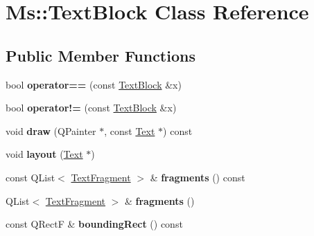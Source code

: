 \hypertarget{class_ms_1_1_text_block}{}\section{Ms\+:\+:Text\+Block Class Reference}
\label{class_ms_1_1_text_block}
\subsection*{Public Member Functions}
\begin{DoxyCompactItemize}
\item 
\mbox{\label{class_ms_1_1_text_block_a792e482fdf503efcc05d595ead80e629}} 
bool {\bfseries operator==} (const \hyperlink{class_ms_1_1_text_block}{Text\+Block} \&x)
\item 
\mbox{\label{class_ms_1_1_text_block_a511e9ebeec24d3b8bf428905e861dce3}} 
bool {\bfseries operator!=} (const \hyperlink{class_ms_1_1_text_block}{Text\+Block} \&x)
\item 
\mbox{\label{class_ms_1_1_text_block_a3822e81e3eb902050f7af7c189ae0f61}} 
void {\bfseries draw} (Q\+Painter $\ast$, const \hyperlink{class_ms_1_1_text}{Text} $\ast$) const
\item 
\mbox{\label{class_ms_1_1_text_block_ae2993f74414bae997d3df73e7d32d664}} 
void {\bfseries layout} (\hyperlink{class_ms_1_1_text}{Text} $\ast$)
\item 
\mbox{\label{class_ms_1_1_text_block_a7b8b3c20e5cb7a4f96177b92be9fa6b2}} 
const Q\+List$<$ \hyperlink{class_ms_1_1_text_fragment}{Text\+Fragment} $>$ \& {\bfseries fragments} () const
\item 
\mbox{\label{class_ms_1_1_text_block_a03229502f08e8d7a8258c72ab1c290f3}} 
Q\+List$<$ \hyperlink{class_ms_1_1_text_fragment}{Text\+Fragment} $>$ \& {\bfseries fragments} ()
\item 
\mbox{\label{class_ms_1_1_text_block_a76b59c3a9d77ecf96a52cf28ebc7a257}} 
const Q\+RectF \& {\bfseries bounding\+Rect} () const
\item 
\mbox{\label{class_ms_1_1_text_block_ad60acb39b38d1c3c847160364570d701}} 

\end{DoxyCompactItemize}

